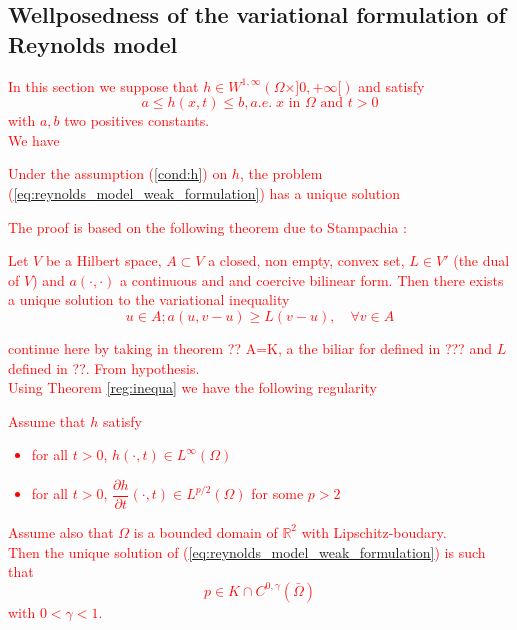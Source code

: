 \subsection{Wellposedness of the variational formulation of Reynolds model} 
\textcolor{red}{In this section we suppose that $h \in W^{1,\infty}(\Omega \times ]0,+\infty[)$ and satisfy
\begin{equation} \label{cond:h}
a \leq h(x,t) \leq b, a.e.\; x \text{ in } \Omega \text{ and } t >0
\end{equation}
with $a,b$ two positives constants.\\ 
We have \cite{stampacchia}
\begin{theorem}
Under the assumption (\ref{cond:h}) on $h$, the problem (\ref{eq:reynolds_model_weak_formulation}) has a unique solution
\end{theorem}
The proof is based on the following theorem due to Stampachia \cite{stampacchia}:
\begin{theorem}
Let $V$ be a Hilbert space, $A\subset V$ a closed, non empty, convex set, $L \in V'$ (the dual of $V$) and $a(\cdot,\cdot)$ a continuous and and coercive bilinear form. Then there exists a unique solution to the variational inequality
$$
u \in A; a(u,v-u) \geq L(v-u), \quad \forall v \in A
$$
\end{theorem}
continue here by taking in theorem ?? A=K, a the biliar for defined in ??? and $L$ defined in ??. From hypothesis.\\
Using Theorem \ref{reg:inequa} we have the following regularity
\begin{theorem}
Assume that $h$ satisfy
\begin{itemize}
\item for all $t >0$, $h(\cdot,t) \in L^{\infty}(\Omega)$
\item for all $t >0$,  $\dfrac{\partial h}{\partial t}(\cdot,t) \in L^{p/2}(\Omega)$ for some $p >2$
\end{itemize}
Assume also that $\Omega$ is a bounded domain of $\mathbb{R}^2$ with Lipschitz-boudary.\\
Then the unique solution of (\ref{eq:reynolds_model_weak_formulation}) is such that
$$
p \in K\cap C^{0,\gamma}(\bar \Omega)
$$
with $0< \gamma < 1$.
\end{theorem}
}
